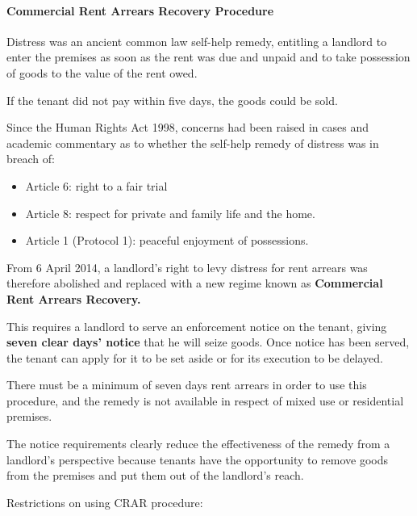 \documentclass[
]{article}
\newenvironment{Shaded}{}{}
\newcommand{\NormalTok}[1]{#1}
\providecommand{\tightlist}{%
  \setlength{\itemsep}{0pt}\setlength{\parskip}{0pt}}
\begin{document}
\hypertarget{commercial-rent-arrears-recovery-procedure}{%
\paragraph{Commercial Rent Arrears Recovery
Procedure}\label{commercial-rent-arrears-recovery-procedure}}

Distress was an ancient common law self-help remedy, entitling a
landlord to enter the premises as soon as the rent was due and unpaid
and to take possession of goods to the value of the rent owed.

If the tenant did not pay within five days, the goods could be sold.

Since the Human Rights Act 1998, concerns had been raised in cases and
academic commentary as to whether the self-help remedy of distress was
in breach of:

\begin{itemize}
\tightlist
\item
  Article 6: right to a fair trial
\item
  Article 8: respect for private and family life and the home.
\item
  Article 1 (Protocol 1): peaceful enjoyment of possessions.
\end{itemize}

From 6 April 2014, a landlord's right to levy distress for rent arrears
was therefore abolished and replaced with a new regime known as
\textbf{Commercial Rent Arrears Recovery.}

This requires a landlord to serve an enforcement notice on the tenant,
giving \textbf{seven clear days' notice} that he will seize goods. Once
notice has been served, the tenant can apply for it to be set aside or
for its execution to be delayed.

\begin{Shaded}
\begin{Highlighting}[]
\NormalTok{There must be a minimum of seven days\textquotesingle{} rent arrears in order to use this procedure, and the remedy is not available in respect of mixed use or residential premises.}
\end{Highlighting}
\end{Shaded}

The notice requirements clearly reduce the effectiveness of the remedy
from a landlord's perspective because tenants have the opportunity to
remove goods from the premises and put them out of the landlord's reach.

Restrictions on using CRAR procedure:
\end{document}
